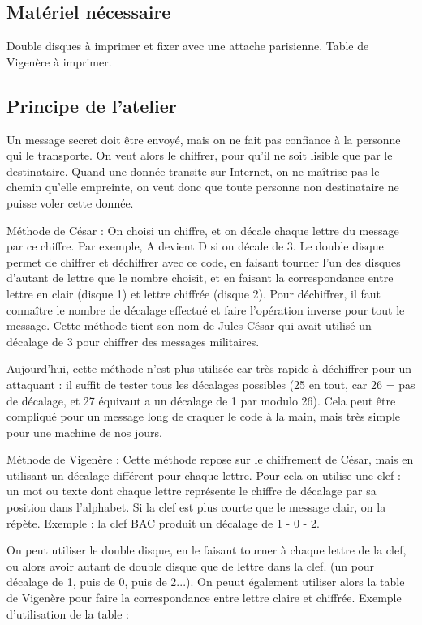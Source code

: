 \documentclass[a4paper]{article}
\begin{document}
\subsection{Matériel nécessaire}
Double disques à imprimer et fixer avec une attache parisienne. Table de Vigenère à imprimer.

\subsection{Principe de l'atelier}
Un message secret doit être envoyé, mais on ne fait pas confiance à la personne qui le transporte. On veut alors le chiffrer, pour qu'il ne soit lisible que par le destinataire. Quand une donnée transite sur Internet, on ne maîtrise pas le chemin qu'elle empreinte, on veut donc que toute personne non destinataire ne puisse voler cette donnée.

Méthode de César :
On choisi un chiffre, et on décale chaque lettre du message par ce chiffre. Par exemple, A devient D si on décale de 3. Le double disque permet de chiffrer et déchiffrer avec ce code, en faisant tourner l'un des disques d'autant de lettre que le nombre choisit, et en faisant la correspondance entre lettre en clair (disque 1) et lettre chiffrée (disque 2).
Pour déchiffrer, il faut connaître le nombre de décalage effectué et faire l'opération inverse pour tout le message. 
Cette méthode tient son nom de Jules César qui avait utilisé un décalage de 3 pour chiffrer des messages militaires.

Aujourd'hui, cette méthode n'est plus utilisée car très rapide à déchiffrer pour un attaquant : il suffit de tester tous les décalages possibles (25 en tout, car 26 = pas de décalage, et 27 équivaut a un décalage de 1 par modulo 26). Cela peut être compliqué pour un message long de craquer le code à la main, mais très simple pour une machine de nos jours.

Méthode de Vigenère :
Cette méthode repose sur le chiffrement de César, mais en utilisant un décalage différent pour chaque lettre. Pour cela on utilise une clef : un mot ou texte dont chaque lettre représente le chiffre de décalage par sa position dans l'alphabet. Si la clef est plus courte que le message clair, on la répète. Exemple : la clef BAC produit un décalage de 1 - 0 - 2.

On peut utiliser le double disque, en le faisant tourner à chaque lettre de la clef, ou alors avoir autant de double disque que de lettre dans la clef. (un pour décalage de 1, puis de 0, puis de 2...). On peuut également utiliser alors la table de Vigenère pour faire la correspondance entre lettre claire et chiffrée. Exemple d'utilisation de la table :
\end{document}
